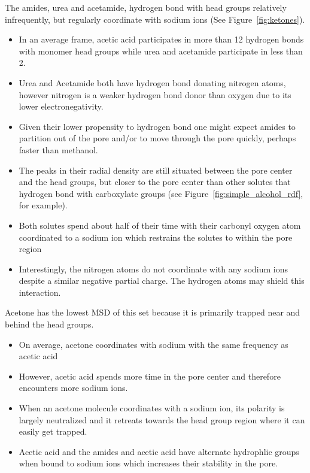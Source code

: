 \documentclass{article}
\begin{document}
  \noindent The amides, urea and acetamide, hydrogen bond with head groups relatively 
  infrequently, but regularly coordinate with sodium ions (See Figure~\ref{fig:ketones}).
  \begin{itemize}
    \item In an average frame, acetic acid participates in more than 12 hydrogen 
    bonds with monomer head groups while urea and acetamide participate in less than 2.
    \item Urea and Acetamide both have hydrogen bond donating nitrogen atoms, however
  	nitrogen is a weaker hydrogen bond donor than oxygen due to its lower electronegativity.
  	\item Given their lower propensity to hydrogen bond one might expect amides to partition
  	out of the pore and/or to move through the pore quickly, perhaps faster than methanol.
    \item The peaks in their radial density are still situated between the pore center and the
    head groups, but closer to the pore center than other solutes that hydrogen bond with 
    carboxylate groups (see Figure~\ref{fig:simple_alcohol_rdf}, for example).
    \item Both solutes spend about half of their time with their carbonyl oxygen atom 
    coordinated to a sodium ion which restrains the solutes to within the pore region
    \item Interestingly, the nitrogen atoms do not coordinate with any sodium ions despite
    a similar negative partial charge. The hydrogen atoms may shield this interaction.
  \end{itemize}   

  Acetone has the lowest MSD of this set because it is primarily trapped near and behind 
  the head groups.
  \begin{itemize}
    \item On average, acetone coordinates with sodium with the same frequency as acetic acid 
    \item However, acetic acid spends more time in the pore center and therefore encounters
    more sodium ions.
    \item When an acetone molecule coordinates with a sodium ion, its polarity is 
    largely neutralized and it retreats towards the head group region where it can easily
    get trapped.
    \item Acetic acid and the amides and acetic acid have alternate hydrophlic
    groups when bound to sodium ions which increases their stability in the pore.
  \end{itemize}
  
\end{document}
